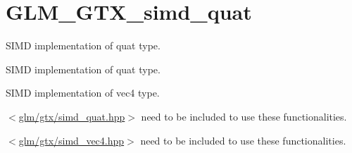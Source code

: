 \hypertarget{group__gtx__simd__vec4}{}\section{G\+L\+M\+\_\+\+G\+T\+X\+\_\+simd\+\_\+quat}
\label{group__gtx__simd__vec4}


S\+I\+MD implementation of quat type.  


S\+I\+MD implementation of quat type. 

S\+I\+MD implementation of vec4 type.

$<$\hyperlink{simd__quat_8hpp}{glm/gtx/simd\+\_\+quat.\+hpp}$>$ need to be included to use these functionalities.

$<$\hyperlink{simd__vec4_8hpp}{glm/gtx/simd\+\_\+vec4.\+hpp}$>$ need to be included to use these functionalities. 